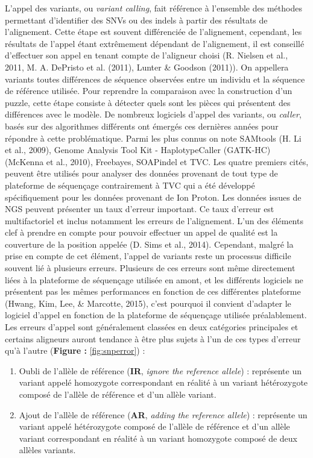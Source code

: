 \documentclass[12pt,twoside]{reedthesis}
\providecommand{\tightlist}{%
  \setlength{\itemsep}{0pt}\setlength{\parskip}{0pt}}
\theoremstyle{definition}
\theoremstyle{definition}
\theoremstyle{remark}
\begin{document}
  L'appel des variants, ou \emph{variant calling}, fait référence à
  l'ensemble des méthodes permettant d'identifier des SNVs ou des indels à
  partir des résultats de l'alignement. Cette étape est souvent
  différenciée de l'alignement, cependant, les résultats de l'appel étant
  extrêmement dépendant de l'alignement, il est conseillé d'effectuer son
  appel en tenant compte de l'aligneur choisi (R. Nielsen et al., 2011, M.
  A. DePristo et al. (2011), Lunter \& Goodson (2011)). On appellera
  variants toutes différences de séquence observées entre un individu et
  la séquence de référence utilisée. Pour reprendre la comparaison avec la
  construction d'un puzzle, cette étape consiste à détecter quels sont les
  pièces qui présentent des différences avec le modèle. De nombreux
  logiciels d'appel des variants, ou \emph{caller}, basés sur des
  algorithmes différents ont émergés ces dernières années pour répondre à
  cette problématique. Parmi les plus connus on note SAMtools (H. Li et
  al., 2009), Genome Analysis Tool Kit - HaplotypeCaller (GATK-HC)
  (McKenna et al., 2010), Freebayes, SOAPindel et TVC. Les quatre premiers
  cités, peuvent être utilisés pour analyser des données provenant de tout
  type de plateforme de séquençage contrairement à TVC qui a été développé
  spécifiquement pour les données provenant de Ion Proton. Les données
  issues de NGS peuvent présenter un taux d'erreur important. Ce taux
  d'erreur est multifactoriel et inclus notamment les erreurs de
  l'alignement. L'un des éléments clef à prendre en compte pour pouvoir
  effectuer un appel de qualité est la couverture de la position appelée
  (D. Sims et al., 2014). Cependant, malgré la prise en compte de cet
  élément, l'appel de variants reste un processus difficile souvent lié à
  plusieurs erreurs. Plusieurs de ces erreurs sont même directement liées
  à la plateforme de séquençage utilisée en amont, et les différents
  logiciels ne présentent pas les mêmes performances en fonction de ces
  différentes plateforme (Hwang, Kim, Lee, \& Marcotte, 2015), c'est
  pourquoi il convient d'adapter le logiciel d'appel en fonction de la
  plateforme de séquençage utilisée préalablement. Les erreurs d'appel
  sont généralement classées en deux catégories principales et certains
  aligneurs auront tendance à être plus sujets à l'un de ces types
  d'erreur qu'à l'autre (\textbf{Figure : }\ref{fig:snperror}) :
  
  \begin{enumerate}
  \def\labelenumi{\arabic{enumi}.}
  \tightlist
  \item
    Oubli de l'allèle de référence (\textbf{IR}, \emph{ignore the
    reference allele}) : représente un variant appelé homozygote
    correspondant en réalité à un variant hétérozygote composé de l'allèle
    de référence et d'un allèle variant.\\
  \item
    Ajout de l'allèle de référence (\textbf{AR}, \emph{adding the
    reference allele}) : représente un variant appelé hétérozygote composé
    de l'allèle de référence et d'un allèle variant correspondant en
    réalité à un variant homozygote composé de deux allèles variants.\\
  \end{enumerate}
  
\end{document}
